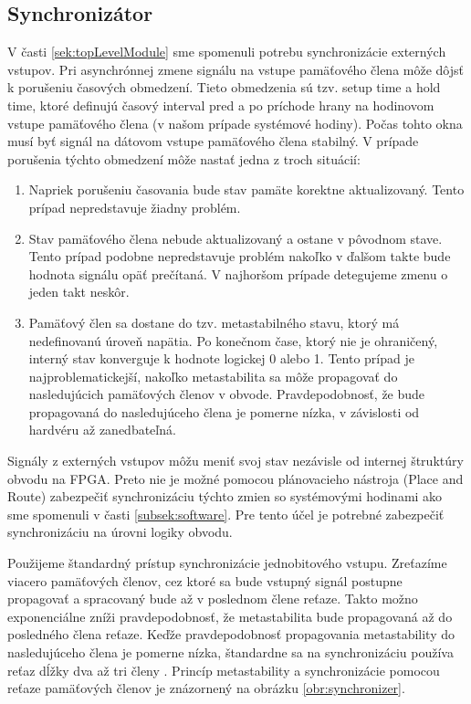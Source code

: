 \subsection{Synchronizátor} \label{subsek:synchronizer}
V časti \ref{sek:topLevelModule} sme spomenuli potrebu synchronizácie externých vstupov. Pri asynchrónnej zmene signálu na vstupe pamäťového člena môže dôjsť k porušeniu časových obmedzení. Tieto obmedzenia sú tzv. setup time a hold time, ktoré definujú časový interval pred a po príchode hrany na hodinovom vstupe pamäťového člena (v našom prípade systémové hodiny). Počas tohto okna musí byť signál na dátovom vstupe pamäťového člena stabilný. V prípade porušenia týchto obmedzení môže nastať jedna z troch situácií:
\begin{enumerate}
    \item Napriek porušeniu časovania bude stav pamäte korektne aktualizovaný. Tento prípad nepredstavuje žiadny problém.
    \item Stav pamäťového člena nebude aktualizovaný a ostane v pôvodnom stave. Tento prípad podobne nepredstavuje problém nakoľko v ďalšom takte bude hodnota signálu opäť prečítaná. V najhoršom prípade detegujeme zmenu o jeden takt neskôr.
    \item Pamäťový člen sa dostane do tzv. metastabilného stavu, ktorý má nedefinovanú úroveň napätia. Po konečnom čase, ktorý nie je ohraničený, interný stav konverguje k hodnote logickej 0 alebo 1. Tento prípad je najproblematickejší, nakoľko metastabilita sa môže propagovať do nasledujúcich pamäťových členov v obvode. Pravdepodobnosť, že bude propagovaná do nasledujúceho člena je pomerne nízka, v závislosti od hardvéru až zanedbateľná.
\end{enumerate}
Signály z externých vstupov môžu meniť svoj stav nezávisle od internej štruktúry obvodu na FPGA. Preto nie je možné pomocou plánovacieho nástroja (Place and Route) zabezpečiť synchronizáciu týchto zmien so systémovými hodinami ako sme spomenuli v časti \ref{subsek:software}. Pre tento účel je potrebné zabezpečiť synchronizáciu na úrovni logiky obvodu.

Použijeme štandardný prístup synchronizácie jednobitového vstupu. Zreťazíme viacero pamäťových členov, cez ktoré sa bude vstupný signál postupne propagovať a spracovaný bude až v poslednom člene reťaze. Takto možno exponenciálne zníži pravdepodobnosť, že metastabilita bude propagovaná až do posledného člena reťaze. Keďže pravdepodobnosť propagovania metastability do nasledujúceho člena je pomerne nízka, štandardne sa na synchronizáciu používa reťaz dĺžky dva až tri členy \cite{metastability}. Princíp metastability a synchronizácie pomocou reťaze pamäťových členov je znázornený na obrázku \ref{obr:synchronizer}.


